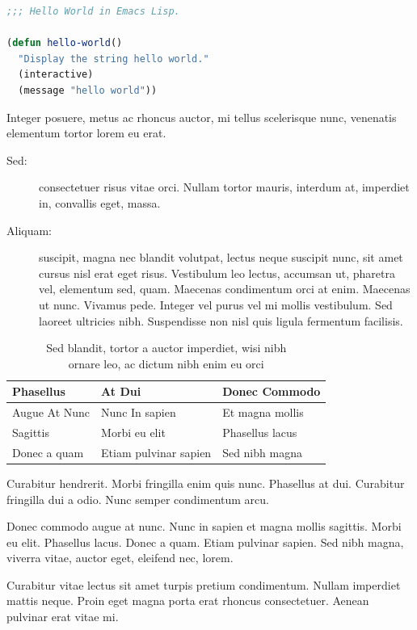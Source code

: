 \documentclass[cfonts,nofontsdir]{nostarch}
\begin{document}
\begin{lstlisting}[language=Lisp, frame=single, float,
  caption={[Hello, World in Emacs
  Lisp]Hello, World in Emacs Lisp%
    \index{Lisp|see{programming languages}}%
    \index{programming languages!Lisp}\index{Emacs}}] 
;;; Hello World in Emacs Lisp.

(defun hello-world()
  "Display the string hello world."
  (interactive)
  (message "hello world"))
\end{lstlisting}

Integer posuere, metus ac rhoncus auctor, mi tellus scelerisque
nunc, venenatis elementum tortor lorem eu erat.
\begin{description}
\item[Sed:] consectetuer risus vitae orci. Nullam tortor
  mauris, interdum at, imperdiet in, convallis eget, massa.
\item[Aliquam:] suscipit, magna nec blandit volutpat, lectus neque
  suscipit nunc, sit amet cursus nisl erat eget risus.
  Vestibulum leo lectus, accumsan ut, pharetra vel, elementum sed,
  quam. Maecenas condimentum orci at enim. Maecenas ut
  nunc. Vivamus pede. Integer vel purus vel mi mollis
  vestibulum. Sed laoreet ultricies nibh.  Suspendisse non nisl quis
  ligula fermentum facilisis.
\end{description}
\lipsum[37]


\begin{table}[tp]
  \caption[Sed blandit, tortor a auctor]{Sed blandit, tortor a auctor
    imperdiet, wisi nibh\\ ornare leo, 
    ac dictum nibh enim eu orci}
  \tbfont
  \begin{tabular}{@{}lll}
    \toprule\let\normalfont=\bfseries%
    \thfont Phasellus &  \thfont At Dui       & \thfont Donec Commodo \\
    \midrule    
     Augue At Nunc    & Nunc In  sapien       & Et magna mollis \\
     Sagittis         &  Morbi eu elit        &  Phasellus lacus\\
     Donec a quam     & Etiam pulvinar sapien & Sed nibh magna\\
    \bottomrule
  \end{tabular}
\label{tab:one}
\end{table}

\lipsum[60]

Curabitur hendrerit. Morbi fringilla enim quis nunc.
Phasellus at dui. Curabitur fringilla dui a odio.  Nunc
semper condimentum arcu.
\begin{note}
  Donec commodo augue at nunc. Nunc in
  sapien et magna mollis sagittis. Morbi eu elit.
  Phasellus lacus.  Donec a quam. Etiam pulvinar sapien.
  Sed nibh magna, viverra vitae, auctor eget, eleifend
  nec, lorem.
\end{note}
Curabitur vitae lectus sit amet turpis pretium
condimentum. Nullam imperdiet mattis neque. Proin eget magna porta
erat rhoncus consectetuer. Aenean pulvinar erat vitae mi.
\end{document}

